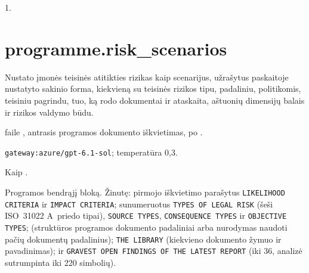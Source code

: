  1.


\section{programme.risk\_scenarios}\label{sec:aprompts:programme-risk_scenarios}

 Nustato įmonės teisinės atitikties rizikas kaip scenarijus, užrašytus
paskaitoje nustatyto sakinio forma, kiekvieną su teisinės rizikos tipu, padaliniu, politikomis,
teisiniu pagrindu, tuo, ką rodo dokumentai ir ataskaita, aštuonių dimensijų balais ir rizikos
valdymo būdu.

  faile , antrasis programos
dokumento iškvietimas, po .

 \texttt{gateway:azure/gpt-6.1-sol}; temperatūra 0,3.

 Kaip .

 Programos bendrąjį bloką. Žinutę: pirmojo iškvietimo parašytus
\texttt{LIKELIHOOD CRITERIA} ir \texttt{IMPACT CRITERIA}; sunumeruotus
\texttt{TYPES OF LEGAL RISK} (šeši ISO~31022 A~priedo tipai), \texttt{SOURCE TYPES},
\texttt{CONSEQUENCE TYPES} ir \texttt{OBJECTIVE TYPES};  (struktūros programos
dokumento padaliniai arba nurodymas naudoti pačių dokumentų padalinius); \texttt{THE LIBRARY}
(kiekvieno dokumento žymuo ir pavadinimas); ir \texttt{GRAVEST OPEN FINDINGS OF THE LATEST REPORT}
(iki 36, analizė sutrumpinta iki 220 simbolių).

